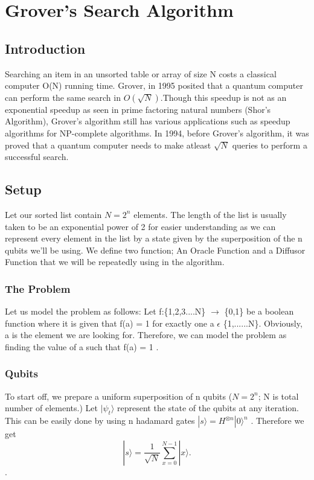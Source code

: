 \chapter{Grover's Search Algorithm}
\section{Introduction}
Searching an item in an unsorted table or array of size N costs a classical computer O(N) running time. Grover, in 1995 posited that a quantum computer can perform the same search in $O(\sqrt{N})$.Though this speedup is not as an exponential speedup as seen in prime factoring natural numbers (Shor's Algorithm), Grover's algorithm still has various applications such as speedup algorithms for NP-complete algorithms. In 1994, before Grover's algorithm, it was proved that a quantum computer needs to make atleast $\sqrt{N}$ queries to perform a successful search.


\section{Setup}
Let our sorted list contain $N=2^n$ elements. The length of the list is usually taken to be an exponential power of 2 for easier understanding as we can represent every element in the list by a state given by the superposition of the n qubits we'll be using. We define two function; An Oracle Function and a Diffusor Function that we will be repeatedly using in the algorithm.


\subsection{The Problem}
Let us model the problem as follows: Let f:\{1,2,3....N\} $\rightarrow$ \{0,1\} be a boolean function where it is given that f(a) = 1 for exactly one a $\epsilon$ \{1,......N\}. Obviously, a is the element we are looking for. Therefore, we can model the problem as finding the value of a such that f(a) = 1 .


\subsection{Qubits}
To start off, we prepare a uniform superposition of n qubits ($N = 2^n$; N is total number of elements.) Let $|\psi_t \rangle$ represent the state of the qubits at any iteration.
This can be easily done by using n hadamard gates $| s \rangle = H^{\otimes n} | 0 \rangle^n$ .
Therefore we get \[ |s \rangle = \frac{1}{\sqrt{N}} \sum_{x = 0}^{N -1} | x
\rangle. \].


